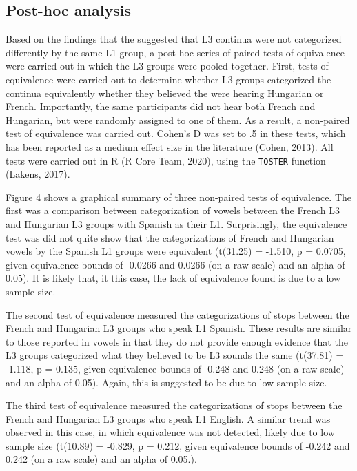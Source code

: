 \documentclass[
  man]{apa6}
\begin{document}
\hypertarget{post-hoc-analysis}{%
\subsection{Post-hoc analysis}\label{post-hoc-analysis}}

Based on the findings that the suggested that L3 continua were not categorized differently by the same L1 group, a post-hoc series of paired tests of equivalence were carried out in which the L3 groups were pooled together.
First, tests of equivalence were carried out to determine whether L3 groups categorized the continua equivalently whether they believed the were hearing Hungarian or French.
Importantly, the same participants did not hear both French and Hungarian, but were randomly assigned to one of them. As a result, a non-paired test of equivalence was carried out. Cohen's D was set to .5 in these tests, which has been reported as a medium effect size in the literature (Cohen, 2013).
All tests were carried out in R (R Core Team, 2020), using the \texttt{TOSTER} function (Lakens, 2017).

Figure 4 shows a graphical summary of three non-paired tests of equivalence. The first was a comparison between categorization of vowels between the French L3 and Hungarian L3 groups with Spanish as their L1. Surprisingly, the equivalence test was did not quite show that the categorizations of French and Hungarian vowels by the Spanish L1 groups were equivalent (t(31.25) = -1.510, p = 0.0705, given equivalence bounds of -0.0266 and 0.0266 (on a raw scale) and an alpha of 0.05).
It is likely that, it this case, the lack of equivalence found is due to a low sample size.

The second test of equivalence measured the categorizations of stops between the French and Hungarian L3 groups who speak L1 Spanish. These results are similar to those reported in vowels in that they do not provide enough evidence that the L3 groups categorized what they believed to be L3 sounds the same (t(37.81) = -1.118, p = 0.135, given equivalence bounds of -0.248 and 0.248 (on a raw scale) and an alpha of 0.05).
Again, this is suggested to be due to low sample size.

The third test of equivalence measured the categorizations of stops between the French and Hungarian L3 groups who speak L1 English. A similar trend was observed in this case, in which equivalence was not detected, likely due to low sample size (t(10.89) = -0.829, p = 0.212, given equivalence bounds of -0.242 and 0.242 (on a raw scale) and an alpha of 0.05.).
\end{document}
